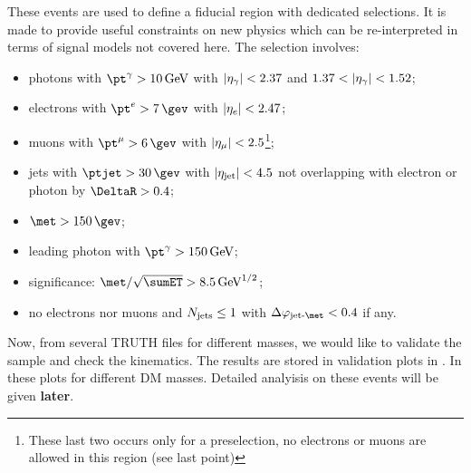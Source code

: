 These events are used to define a fiducial region with dedicated selections. It is made to provide useful constraints on new physics which can be re-interpreted in terms of signal models not covered here. The selection involves:
\begin{itemize}
\item photons with $\pt^\gamma>\SI{10}{\GeV}$ with $\lvert\eta_\gamma\rvert<2.37$ and $1.37<\lvert\eta_\gamma\rvert<1.52$;
\item electrons with $\pt^e>\SI{7}{\gev}$ with $\lvert\eta_e\rvert<2.47$;
\item muons with $\pt^\mu>\SI{6}{\gev}$ with $\lvert\eta_\mu\rvert<2.5$\footnote{These last two occurs only for a preselection, no electrons or muons are allowed in this region (see last point)};
\item jets with $\ptjet>\SI{30}{\gev}$ with $\lvert\eta_{\textup{jet}}\rvert<4.5$ not overlapping with electron or photon by $\DeltaR > 0.4$;
\item $\met>\SI{150}{\gev}$;
\item leading photon with $\pt^\gamma > \SI{150}{\GeV}$;
\item \met significance: $\met/\sqrt{\sumET} > \SI{8.5}{\GeV^{1/2}}$;
\item no electrons nor muons and $N_\textup{jets}\le 1$ with $\Delta\phi_\textup{jet-\met}<0.4$ if any.
\end{itemize}


Now, from several TRUTH files for different masses, we would like to validate the sample and check the kinematics. The results are stored in validation plots in \Fig{\ref{fig:validation}}. In these plots for different DM masses. Detailed analyisis on these events will be given {\bfseries later}.


